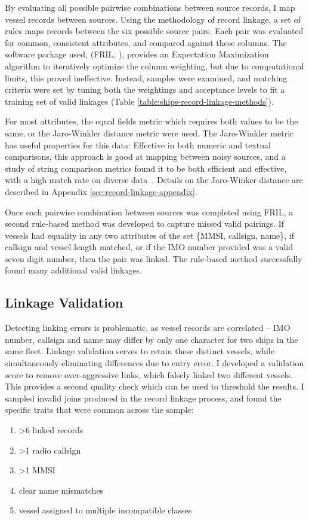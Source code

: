 By evaluating all possible pairwise combinations between source records, I map vessel records between sources. Using the methodology of record linkage, a set of rules maps records between the six possible source pairs. Each pair was evaluated for common, consistent attributes, and compared against these columns. The software package used, (FRIL, \citealp{Jurczyk2008fril}), provides an Expectation Maximization algorithm to iteratively optimize the column weighting, but due to computational limits, this proved ineffective. Instead, samples were examined, and matching criteria were set by tuning both the weightings and acceptance levels to fit a training set of valid linkages (Table \ref{table:ships-record-linkage-methods}). 

For most attributes, the equal fields metric which requires both values to be the same, or the Jaro-Winkler distance metric were used. The Jaro-Winkler metric  has useful properties for this data: Effective in both numeric and textual comparisons, this approach is good at mapping between noisy sources, and a study of string comparison metrics found it to be both efficient and effective, with a high match rate on diverse data~\citep{Cohen2003}. Details on the Jaro-Winker distance are described in Appendix \ref{sec:record-linkage-appendix}.

Once each pairwise combination between sources was completed using FRIL, a second rule-based method was developed to capture missed valid pairings. If vessels had equality in any two attributes of the set \{MMSI, callsign, name\}, if callsign and vessel length matched, or if the IMO number provided was a valid seven digit number, then the pair was linked. The rule-based method successfully found many additional valid linkages.

\subsection{Linkage Validation}
Detecting linking errors is problematic, as vessel records are correlated -- IMO number, callsign and name may differ by only one character for two ships in the same fleet.  Linkage validation serves to retain these distinct vessels, while simultaneously eliminating differences due to entry error. I developed a validation score to remove over-aggressive links, which falsely linked two different vessels. This provides a second quality check which can be used to threshold the results.  I sampled invalid joins produced in the record linkage process, and found the specific traits that were common across the sample:
\begin{enumerate}[noitemsep]
 \item >6 linked records
 \item >1 radio callsign
 \item >1 MMSI
 \item clear name mismatches
 \item vessel assigned to multiple incompatible classes
\end{enumerate}

